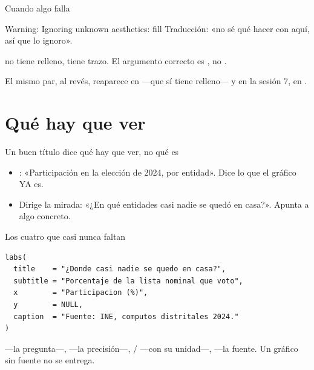 \begin{frame}{Cuando algo falla}
  \vspace{0.4em}
  \begin{errorbox}{Warning: Ignoring unknown aesthetics: fill}
    Traducción: «no sé qué hacer con  aquí, así que lo ignoro».

    \vspace{0.5em}
     no tiene relleno, tiene trazo. El argumento
    correcto es , no .
  \end{errorbox}

  \vspace{1.0em}
  El mismo par, al revés, reaparece en  —que sí tiene
  relleno— y en la sesión 7, en .
\end{frame}

\section{Qué hay que ver}

\begin{frame}{Un buen título dice qué hay que ver, no qué es}
  \vspace{0.3em}
  \begin{itemize}\setlength{\itemsep}{1.0em}
    \item<1-> : «Participación en la elección de 2024,
          por entidad». Dice lo que el gráfico YA es.
    \item<2-> \ac{Dirige la mirada}: «¿En qué entidades casi nadie se
          quedó en casa?». Apunta a algo concreto.
  \end{itemize}

  \vspace{1.2em}
\end{frame}

\begin{frame}[fragile]{Los cuatro que casi nunca faltan}
\begin{lstlisting}
labs(
  title    = "¿Donde casi nadie se quedo en casa?",
  subtitle = "Porcentaje de la lista nominal que voto",
  x        = "Participacion (%)",
  y        = NULL,
  caption  = "Fuente: INE, computos distritales 2024."
)
\end{lstlisting}

  \vspace{0.5em}
   —la pregunta—,  —la precisión—, /
  —con su unidad—,  —la fuente. Un gráfico sin fuente no se
  entrega.
\end{frame}

